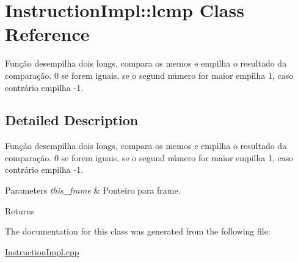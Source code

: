 \hypertarget{class_instruction_impl_1_1lcmp}{}\section{Instruction\+Impl\+:\+:lcmp Class Reference}
\label{class_instruction_impl_1_1lcmp}


Função desempilha dois longs, compara os memos e empilha o resultado da comparação. 0 se forem iguais, se o segund número for maior empilha 1, caso contrário empilha -\/1.  




\subsection{Detailed Description}
Função desempilha dois longs, compara os memos e empilha o resultado da comparação. 0 se forem iguais, se o segund número for maior empilha 1, caso contrário empilha -\/1. 


\begin{DoxyParams}{Parameters}
{\em this\+\_\+frame} & Ponteiro para frame. \\
\hline
\end{DoxyParams}
\begin{DoxyReturn}{Returns}

\end{DoxyReturn}


The documentation for this class was generated from the following file\+:\begin{DoxyCompactItemize}
\item 
\hyperlink{_instruction_impl_8cpp}{Instruction\+Impl.\+cpp}\end{DoxyCompactItemize}
